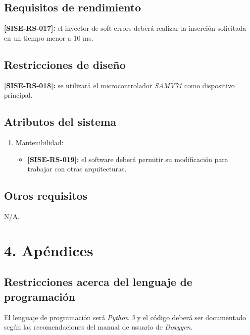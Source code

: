 \documentclass[
11pt, %
codirector, %
]{charter}
\def\codigo{SISE-RS}
\newcommand{\req}[1]{\textbf{[\codigo-#1]:}}
\begin{document}
\subsection{Requisitos de rendimiento}
\label{sub:rendimiento}

\req{017} el inyector de soft-errors deberá realizar la inserción solicitada en un tiempo menor a 10 ms.

\subsection{Restricciones de diseño}
\label{sub:restriccionesDiseño}

\req{018} se utilizará el microcontrolador \emph{SAMV71} como dispositivo principal.

\subsection{Atributos del sistema}
\label{sub:atributos}

\begin{enumerate}
	\item Mantenibilidad:
	\begin{itemize}
		\item \req{019} el software deberá permitir su modificación para trabajar con otras arquitecturas.
	\end{itemize}
\end{enumerate}

\subsection{Otros requisitos}
\label{sub:otros}

N/A.

\section{4. Apéndices}
\label{sec:apendices}



\subsection{Restricciones acerca del lenguaje de programación}

El lenguaje de programación será \emph{Python 3} y el código deberá ser documentado según las recomendaciones del manual de usuario de \emph{Doxygen}.
\end{document}
